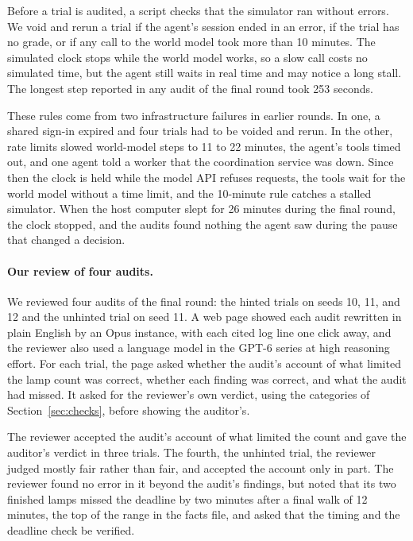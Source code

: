 \documentclass[10pt]{article}
\begin{document}
Before a trial is audited, a script checks that the simulator ran without errors. We void and rerun a trial if the agent's session
ended in an error, if the trial has no grade, or if any call to the world model took more than 10 minutes. The simulated clock
stops while the world model works, so a slow call costs no simulated time, but the agent still waits in real time and may notice a
long stall. The longest step reported in any audit of the final round took 253 seconds.

These rules come from two infrastructure failures in earlier rounds. In one, a shared sign-in expired and four trials had to be
voided and rerun. In the other, rate limits slowed world-model steps to 11 to 22 minutes, the agent's tools timed out, and one agent
told a worker that the coordination service was down. Since then the clock is held while the model API refuses requests, the tools
wait for the world model without a time limit, and the 10-minute rule catches a stalled simulator. When the host computer slept for
26 minutes during the final round, the clock stopped, and the audits found nothing the agent saw during the pause that changed a
decision.

\paragraph{Our review of four audits.} We reviewed four audits of the final round: the hinted trials on seeds 10, 11, and 12
and the unhinted trial on seed 11. A web page showed each audit rewritten in plain English by an Opus instance, with each cited log
line one click away, and the reviewer also used a language model in the GPT-6 series at high reasoning effort. For each trial, the
page asked whether the audit's account of what limited the lamp count was correct, whether each finding was correct, and what the
audit had missed. It asked for the reviewer's own verdict, using the categories of Section~\ref{sec:checks}, before showing the auditor's.

The reviewer accepted the audit's account of what limited the count and gave the auditor's verdict in three trials. The fourth,
the unhinted trial, the reviewer judged mostly fair rather than fair, and accepted the account only in part. The reviewer found no
error in it beyond the audit's findings, but noted that its two finished lamps missed the deadline by two minutes after a final walk
of 12 minutes, the top of the range in the facts file, and asked that the timing and the deadline check be verified.
\end{document}
